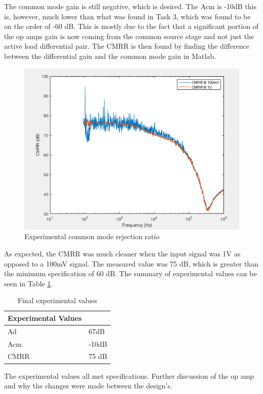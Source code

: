 The common mode gain is still negative, which is desired. The Acm is -10dB this is, however, much lower than what was found in Task 3, which was found to be on the order of -60 dB. This is mostly due to the fact that a significant portion of the op amps gain is now coming from the common source stage and not just the active load differential pair. The CMRR is then found by finding the difference between the differential gain and the common mode gain in Matlab.


\begin{figure}[H]
	\begin{center}
		\includegraphics[scale=.40]{ExperimentalImplementation/CMRR_fin.png}
		\caption{Experimental common mode rejection ratio}
		\label{fig:cmrr}
	\end{center}
\end{figure}

 As expected, the CMRR was much cleaner when the input signal was 1V as opposed to a 100mV signal. The measured value was 75 dB, which is greater than the minimum specification of 60 dB. The summary of experimental values can be seen in Table \ref{tab:expfin}.
 
 
 \begin{table}[H]
 	\centering
 	\caption{Final experimental values}
 	\label{tab:expfin}
 	\begin{tabular}{|l|l|}
 		\hline
 		\textbf{Experimental Values} &       \\ \hline
 		Ad                           & 67dB  \\ \hline
 		Acm                          & -10dB \\ \hline
 		CMRR                         & 75 dB \\ \hline
 	\end{tabular}
 \end{table}

The experimental values all met specifications. Further discussion of the op amp and why the changes were made between the design's. 


 



